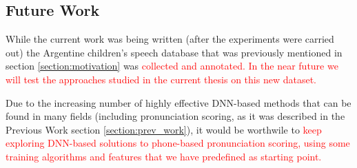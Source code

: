 \subsection{Future Work}

While the current work was being written (after the experiments were carried out)
the Argentine children's speech database that was previously mentioned in section
\ref{section:motivation} was \textcolor{red}{
  collected and annotated. In the near future we will test the approaches studied
  in the current thesis
  on this new dataset.
}


Due to the increasing number of highly effective DNN-based methods that can be found in
many fields (including pronunciation scoring,
as it was described in the Previous Work section \ref{section:prev_work}),
it would be worthwile to \textcolor{red}{
keep exploring DNN-based solutions to phone-based pronunciation scoring, using
some training algorithms and features that we have predefined as starting point.}



